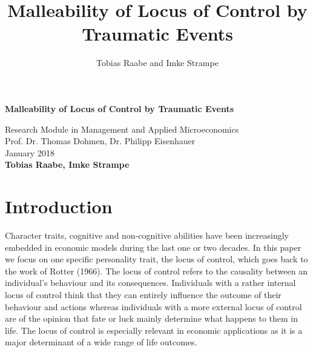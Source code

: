 \documentclass[12pt, a4paper, fleqn, parskip]{scrartcl}
\author{Tobias Raabe and Imke Strampe}
\title{Malleability of Locus of Control by Traumatic Events}
\begin{document}
	\begin{titlepage}
		\begin{center}
			\vspace*{35mm}
			{\bfseries\Large{Malleability of Locus of Control by Traumatic Events}\\
			\vspace{25mm}}
			\begin{spacing}{1.3}
				\large Research Module in Management and Applied Microeconomics\\
				\vspace{65mm}
			   Prof. Dr. Thomas Dohmen, Dr. Philipp Eisenhauer \\
				\vspace{10mm}
				January 2018   \\
				\textbf{Tobias Raabe, Imke Strampe} \\
			\end{spacing}
		\end{center}
	\end{titlepage}
\tableofcontents

\pagebreak

\listoffigures  {} \clearpage
\listoftables  {} \clearpage

\pagebreak


\section{Introduction}
Character traits, cognitive and non-cognitive abilities have been increasingly
embedded in economic models during the last one or two decades. In this paper
we focus on one specific personality trait, the locus of control, which goes
back to the work of Rotter (1966). The locus of control refers to the causality
between an individual's behaviour and its consequences. Individuals with a
rather internal locus of control think that they can entirely influence the
outcome of their behaviour and actions whereas individuals with a more external
locus of control are of the opinion that fate or luck mainly determine what
happens to them in life. The locus of control is especially relevant in
economic applications as it is a major determinant of a wide range of life
outcomes.
\end{document}
